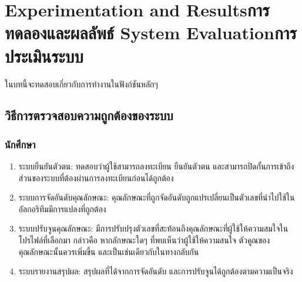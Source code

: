 \chapter{\ifproject%
\ifenglish Experimentation and Results\else การทดลองและผลลัพธ์\fi
\else%
\ifenglish System Evaluation\else การประเมินระบบ\fi
\fi}

ในบทนี้จะทดสอบเกี่ยวกับการทำงานในฟังก์ชันหลักๆ

\section{วิธีการตรวจสอบความถูกต้องของระบบ}
\subsection{นักศึกษา}
\begin{enumerate}
    \item ระบบยืนยันตัวตน: ทดสอบว่าผู้ใช้สามารถลงทะเบียน ยืนยันตัวตน และสามารถปิดกั้นการเข้าถึงส่วนของระบบที่ต้องผ่านการลงทะเบียนก่อนได้ถูกต้อง
    \item ระบบการจัดอันดับคุณลักษณะ: คุณลักษณะที่ถูกจัดอันดับถูกแปรเปลี่ยนเป็นตัวเลขที่นำไปใช้ในอัลกอริทึมมีการแปลงที่ถูกต้อง
    \item ระบบปรับจูนคุณลักษณะ: มีการปรับปรุงตัวเลขที่สะท้อนถึงคุณลักษณะที่ผู้ใช้ให้ความสมใจในโปรไฟล์ที่เลือกมา
            กล่าวคือ หากลักษณะใดๆ ที่พบเห็นว่าผู้ใช้ให้ความสนใจ ตัวคูณของคุณลักษณะนั้นควรเพิ่มขึ้น และเป็นเช่นเดียวกับในทางกลับกัน
    \item ระบบรายงานสรุปผล: สรุปผลที่ได้จากการจัดอันดับ และการปรับจูนได้ถูกต้องตามความเป็นจริง
\end{enumerate}


